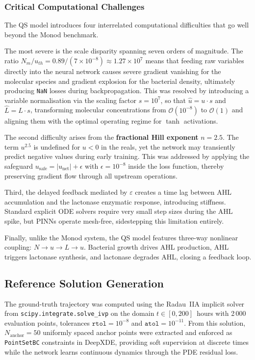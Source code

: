 \documentclass[14pt,a4paper,openany]{extbook}
\begin{document}
\subsubsection{Critical Computational Challenges}

The QS model introduces four interrelated computational difficulties that go well
beyond the Monod benchmark.

The most severe is the scale disparity spanning seven orders of magnitude.
The ratio $N_m / u_{th} = 0.89 / (7 \times 10^{-8}) \approx 1.27 \times 10^{7}$ means that feeding raw variables directly into the neural network causes severe gradient vanishing for the molecular species and gradient explosion for the bacterial density, ultimately producing \texttt{NaN} losses during backpropagation. This was resolved by introducing a variable normalisation via the scaling factor $s = 10^{7}$, so that $\hat{u} = u \cdot s$ and $\hat{L} = L \cdot s$, transforming molecular concentrations from $\mathcal{O}(10^{-8})$ to $\mathcal{O}(1)$ and aligning them with the optimal operating regime for $\tanh$ activations.

The second difficulty arises from the \textbf{fractional Hill exponent} $n = 2.5$. The term $u^{2.5}$ is undefined for $u < 0$ in the reals, yet the network may
transiently predict negative values during early training.  This was addressed by
applying the safeguard $u_{\mathrm{safe}} = |u_{\mathrm{net}}| + \epsilon$ with
$\epsilon = 10^{-8}$ inside the loss function, thereby preserving gradient flow
through all upstream operations.

Third, the delayed feedback mediated by $\varepsilon$ creates a time lag
between AHL accumulation and the lactonase enzymatic response, introducing stiffness.
Standard explicit ODE solvers require very small step sizes during the AHL spike, but
PINNs operate mesh-free, sidestepping this limitation entirely.

Finally, unlike the Monod system, the QS model features three-way nonlinear
coupling: $N \to u \to L \to u$.  Bacterial growth drives AHL production, AHL triggers
lactonase synthesis, and lactonase degrades AHL, closing a feedback loop.

\subsection{Reference Solution Generation}
\label{subsec:qs_reference}

The ground-truth trajectory was computed using the Radau~IIA implicit solver from \texttt{scipy.integrate.solve\_ivp} on the domain $t \in [0, 200]$~hours with 2\,000 evaluation points, tolerances $\texttt{rtol} = 10^{-8}$ and $\texttt{atol} = 10^{-11}$. From this solution, $N_{\mathrm{anchor}} = 50$ uniformly spaced anchor points were
extracted and enforced as \texttt{PointSetBC} constraints in DeepXDE, providing soft supervision at discrete times while the network learns continuous dynamics through the PDE residual loss.
\end{document}

